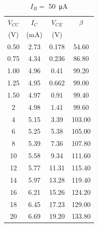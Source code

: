 \begin{table}[hbtp]
  \centering
  \begin{tabular}{cccc}
    $V_{CC}$ & $I_C$     & $V_{CE}$ & $\beta$ \\
    (\si{V}) & (\si{mA}) & (\si{V}) &         \\
    \hline
    0.50     & 2.73      & 0.178    & 54.60   \\
    0.75     & 4.34      & 0.236    & 86.80   \\
    1.00     & 4.96      & 0.41     & 99.20   \\
    1.25     & 4.95      & 0.662    & 99.00   \\
    1.50     & 4.97      & 0.91     & 99.40   \\
    2        & 4.98      & 1.41     & 99.60   \\
    4        & 5.15      & 3.39     & 103.00  \\
    6        & 5.25      & 5.38     & 105.00  \\
    8        & 5.39      & 7.36     & 107.80  \\
    10       & 5.58      & 9.34     & 111.60  \\
    12       & 5.77      & 11.31    & 115.40  \\
    14       & 5.97      & 13.28    & 119.40  \\
    16       & 6.21      & 15.26    & 124.20  \\
    18       & 6.45      & 17.23    & 129.00  \\
    20       & 6.69      & 19.20    & 133.80  \\
  \end{tabular}
  \caption{\label{tab:2}$I_B = $ \SI{50}{\micro\ampere}}
\end{table}

